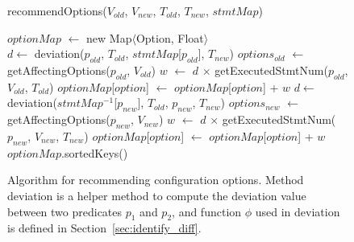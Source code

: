 \begin{figure}[t]
recommendOptions($\mathit{V_{old}}$, $\mathit{V_{new}}$, $\mathit{T_{old}}$, $\mathit{T_{new}}$, $\mathit{stmtMap}$)\\
\vspace{-4mm}%
\begin{algorithmic}[1]
\STATE $\mathit{optionMap}$ $\leftarrow$ new Map$\langle$Option, Float$\rangle$\\
\STATE $\mathit{d} \leftarrow$ deviation($\mathit{p_{old}}$, $\mathit{T_{old}}$, $\mathit{stmtMap}$[$\mathit{p_{old}}$], $\mathit{T_{new}}$)
\STATE $\mathit{options_{old}}$ $\leftarrow$ getAffectingOptions($\mathit{p_{old}}$, $\mathit{V_{old}}$)
\STATE $\mathit{w}$ $\leftarrow$ $\mathit{d}$ $\times$ getExecutedStmtNum($\mathit{p_{old}}$, $\mathit{V_{old}}$, $\mathit{T_{old}}$)
\STATE $\mathit{optionMap}$[$\mathit{option}$] $\leftarrow$ $\mathit{optionMap}$[$\mathit{option}$] + $\mathit{w}$
\ENDFOR
\ENDFOR
{}
\STATE $\mathit{d} \leftarrow$ deviation($\mathit{stmtMap^{-1}}$[$\mathit{p_{new}}$], $\mathit{T_{old}}$, $\mathit{p_{new}}$, $\mathit{T_{new}}$)
\STATE $\mathit{options_{new}}$ $\leftarrow$ getAffectingOptions($\mathit{p_{new}}$, $\mathit{V_{new}}$)
\STATE $\mathit{w}$ $\leftarrow$ $\mathit{d}$ $\times$ getExecutedStmtNum($\mathit{p_{new}}$, $\mathit{V_{new}}$, $\mathit{T_{new}}$)
\STATE $\mathit{optionMap}$[$\mathit{option}$] $\leftarrow$ $\mathit{optionMap}$[$\mathit{option}$] + $\mathit{w}$
\ENDFOR
\ENDFOR
\RETURN $\mathit{optionMap}$.sortedKeys()
\vspace{-2mm}
\end{algorithmic}
\caption{Algorithm for recommending configuration options.
Method deviation is a helper method to compute the deviation
value between two predicates $\mathit{p_1}$ and $\mathit{p_2}$, and function $\phi$
used in deviation is defined in Section~\ref{sec:identify_diff}.
\label{fig:recommend}
}


\end{figure}

